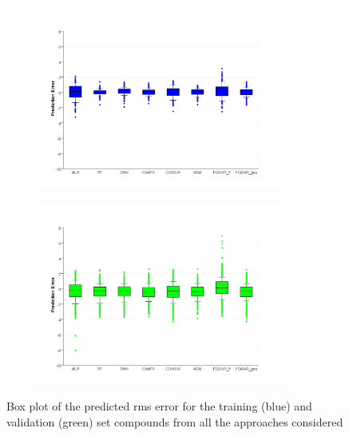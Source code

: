 \begin{figure}
\centering
\begin{subfigure}
\centering
\includegraphics[width=0.9\textwidth]{Images/bace_fig3A.png}
\end{subfigure}
\begin{subfigure}
  \centering
  \includegraphics[width=0.9\textwidth]{Images/bace_fig3B.png}
\end{subfigure}
\caption{Box plot of the predicted rms error for the training (blue) and validation (green) set compounds from all the approaches considered}
\label{fig:bace_3}
\end{figure}

